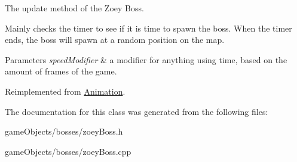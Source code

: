 The update method of the Zoey Boss. 

Mainly checks the timer to see if it is time to spawn the boss. When the timer ends, the boss will spawn at a random position on the map. 
\begin{DoxyParams}{Parameters}
{\em speed\+Modifier} & a modifier for anything using time, based on the amount of frames of the game. \\
\hline
\end{DoxyParams}


Reimplemented from \hyperlink{class_animation_ae17ebf5f4b47801e460eb63342d858e8}{Animation}.



The documentation for this class was generated from the following files\+:\begin{DoxyCompactItemize}
\item 
game\+Objects/bosses/zoey\+Boss.\+h\item 
game\+Objects/bosses/zoey\+Boss.\+cpp\end{DoxyCompactItemize}
